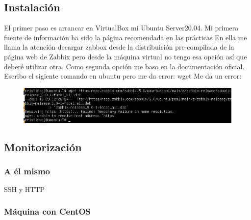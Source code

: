 \subsection{Instalación}
El primer paso es arrancar en VirtualBox mi Ubuntu Server20.04. \newline 
Mi primera fuente de información ha sido la página recomendada en las prácticas %
\newline
En ella me llama la atención decargar zabbox desde la distribuición pre-compilada de la página web de Zabbix pero desde la máquina virtual no tengo esa opción así que deberé utilizar otra. 
\newline
Como segunda opción me baso en la documentación oficial. %
\newline
Escribo el sigiente comando en ubuntu pero me da error: 
wget %
\newline
Me da un error:
\begin{figure}[H]
\centering
\includegraphics[scale=0.5]{Error1.jpg}
\end{figure} 

\subsection{Monitorización}
\subsubsection{A él mismo}
SSH y HTTP
\subsubsection{Máquina con CentOS}
\newpage

